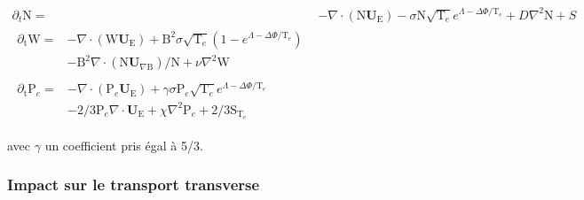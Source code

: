 \begin{refsection}
\begin{align}
\label{2-eqContinuiteTemp}
\partial_t \text{N}
=& - \nabla\cdot\left(\text{N}\mathbf U_\text{E}\right) -\sigma
\text{N}\sqrt{\text{T}_e}e^{\Lambda-\Delta\Phi/\text{T}_e} + D\nabla^2 \text{N}
+ S
\\[0.5cm]
\label{2-eqCourantTemp}
\begin{split}
\partial_\text{t}\text{W} =& 
-\nabla\cdot\left(\text{W}\mathbf U_\text{E}\right)
+\text{B}^2\sigma\sqrt{\text{T}_e}\left(1-e^{\Lambda-\Delta\Phi/\text{T}_e}\right)\\
&-\text{B}^2\nabla\cdot\left(\text{N}\mathbf
U_{\nabla\text{B}}\right)/\text{N} +\nu\nabla^2\text{W}
\end{split}
\\[0.5cm]
\label{2-eqEnergyTemp}
\begin{split}
\partial_\text{t}\text{P}_e=&
-\nabla\cdot\left(\text{P}_e\mathbf U_\text{E}\right)
+\gamma\sigma\text{P}_e\sqrt{\text{T}_e}e^{\Lambda-\Delta\Phi/\text{T}_e}\\
&-2/3\text{P}_e\nabla\cdot\mathbf U_\text{E}
+\chi\nabla^2\text{P}_e
+2/3\text{S}_{\text{T}_e}
\end{split}
\end{align}


avec $\gamma$ un coefficient pris égal à 5/3. 
\subsubsection{Impact sur le transport transverse}


\end{refsection}
